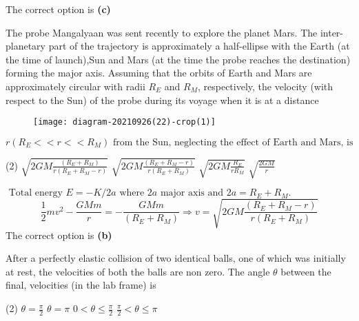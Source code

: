 \begin{enumerate}
\begin{answer}
The correct option is \textbf{(c)}	
\end{answer}
\begin{minipage}{\textwidth}
	\item The probe Mangalyaan was sent recently to explore the planet Mars. The inter-planetary part of the trajectory is approximately a half-ellipse with the Earth (at the time of launch),Sun and Mars (at the time the probe reaches the destination) forming the major axis. Assuming that the orbits of Earth and Mars are approximately circular with radii $R_{E}$ and $R_{M}$, respectively, the velocity (with respect to the Sun) of the probe during its voyage when it is at a distance
		\begin{figure}[H]
		\centering
		\texttt{[image: diagram-20210926(22)-crop(1)]}
	\end{figure}
	 $r\left(R_{E}<<r<<R_{M}\right) \text { from the Sun, neglecting the effect of Earth and Mars, is }$
\end{minipage}
\begin{tasks}(2)
	\task[\textbf{A.}] $\sqrt{2 G M \frac{\left(R_{E}+R_{M}\right)}{r\left(R_{E}+R_{M}-r\right)}}$
	\task[\textbf{B.}]$\sqrt{2 G M \frac{\left(R_{E}+R_{M}-r\right)}{r\left(R_{E}+R_{M}\right)}}$
	\task[\textbf{C.}]$\sqrt{2 G M \frac{R_{E}}{r R_{M}}}$
	\task[\textbf{D.}]$\sqrt{\frac{2 G M}{r}}$
\end{tasks}
\begin{answer}
	$\text { Total energy } E=-K / 2 a \text { where } 2 a \text { major axis and } 2 a=R_{E}+R_{M} \text {. }$
	$$\frac{1}{2} m v^{2}-\frac{G M m}{r}=-\frac{G M m}{\left(R_{E}+R_{M}\right)} \Rightarrow v=\sqrt{2 G M \frac{\left(R_{E}+R_{M}-r\right)}{r\left(R_{E}+R_{M}\right)}}$$
	The correct option is \textbf{(b)}
\end{answer}
\begin{minipage}{\textwidth}
	\item After a perfectly elastic collision of two identical balls, one of which was initially at rest, the velocities of both the balls are non zero. The angle $\theta$ between the final, velocities (in the lab frame) is
\end{minipage}
\begin{tasks}(2)
	\task[\textbf{A.}] $\theta=\frac{\pi}{2}$
	\task[\textbf{B.}]$\theta=\pi$
	\task[\textbf{C.}]$0<\theta \leq \frac{\pi}{2}$
	\task[\textbf{D.}] $\frac{\pi}{2}<\theta \leq \pi$
\end{tasks}
\begin{answer}

\end{answer}
\end{enumerate}
